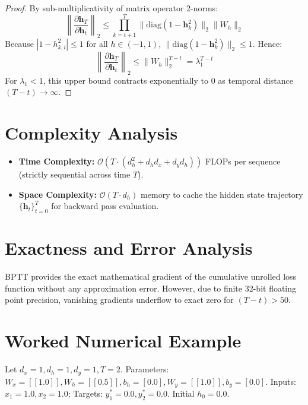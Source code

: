 \documentclass[11pt,a4paper]{article}
\theoremstyle{definition}
\begin{document}
\begin{proof}
By sub-multiplicativity of matrix operator 2-norms:
\begin{equation}
\left\| \frac{\partial \mathbf{h}_T}{\partial \mathbf{h}_t} \right\|_2 \le \prod_{k=t+1}^T \|\text{diag}(1 - \mathbf{h}_k^2)\|_2 \|W_h\|_2
\end{equation}
Because $|1 - h_{k, i}^2| \le 1$ for all $h \in (-1, 1)$, $\|\text{diag}(1 - \mathbf{h}_k^2)\|_2 \le 1$. Hence:
\begin{equation}
\left\| \frac{\partial \mathbf{h}_T}{\partial \mathbf{h}_t} \right\|_2 \le \|W_h\|_2^{T-t} = \lambda_1^{T-t}
\end{equation}
For $\lambda_1 < 1$, this upper bound contracts exponentially to 0 as temporal distance $(T - t) \to \infty$.
\end{proof}

\section{Complexity Analysis}

\begin{itemize}
    \item \textbf{Time Complexity:} $\mathcal{O}(T \cdot (d_h^2 + d_h d_x + d_y d_h))$ FLOPs per sequence (strictly sequential across time $T$).
    \item \textbf{Space Complexity:} $\mathcal{O}(T \cdot d_h)$ memory to cache the hidden state trajectory $\{\mathbf{h}_t\}_{t=0}^T$ for backward pass evaluation.
\end{itemize}

\section{Exactness and Error Analysis}

BPTT provides the exact mathematical gradient of the cumulative unrolled loss function without any approximation error. However, due to finite 32-bit floating point precision, vanishing gradients underflow to exact zero for $(T - t) > 50$.

\section{Worked Numerical Example}

Let $d_x=1, d_h=1, d_y=1, T=2$.
Parameters: $W_x = [[1.0]], W_h = [[0.5]], b_h = [0.0], W_y = [[1.0]], b_y = [0.0]$.
Inputs: $x_1 = 1.0, x_2 = 1.0$; Targets: $y_1^* = 0.0, y_2^* = 0.0$.
Initial $h_0 = 0.0$.
\end{document}
